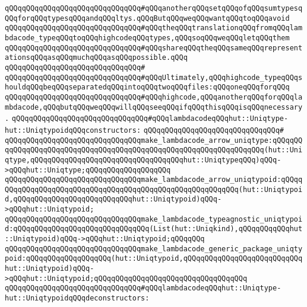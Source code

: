 \verb|qQQqqQQqqQQqqQQqqQQqqQQqqQQqqQQq#qQQqanotherqQQqsetqQQqofqQQqsumtypesqQQqforqQQqtypesqQQqandqQQqltys.qQQqButqQQqweqQQqwantqQQqtoqQQqavoid|\newline
\verb|qQQqqQQqqQQqqQQqqQQqqQQqqQQqqQQq#qQQqtheqQQqtranslationqQQqfromqQQqlambdacode_typeqQQqtoqQQqhighcodeqQQqtypes,qQQqsoqQQqweqQQqletqQQqthem|\newline
\verb|qQQqqQQqqQQqqQQqqQQqqQQqqQQqqQQq#qQQqshareqQQqtheqQQqsameqQQqrepresentationsqQQqasqQQqmuchqQQqasqQQqpossible.qQQq|\newline
\verb|qQQqqQQqqQQqqQQqqQQqqQQqqQQqqQQq#|\newline
\verb|qQQqqQQqqQQqqQQqqQQqqQQqqQQqqQQq#qQQqUltimately,qQQqhighcode_typeqQQqshouldqQQqbeqQQqseparatedqQQqintoqQQqtwoqQQqfiles:qQQqoneqQQqforqQQq|\newline
\verb|qQQqqQQqqQQqqQQqqQQqqQQqqQQqqQQq#qQQqhighcode,qQQqanotherqQQqforqQQqlambdacode,qQQqbutqQQqweqQQqwillqQQqseeqQQqifqQQqthisqQQqisqQQqnecessary.|\newline
\newline
\newline
\verb|qQQqqQQqqQQqqQQqqQQqqQQqqQQqqQQq#qQQqlambdacodeqQQqhut::Uniqtype-hut::UniqtypoidqQQqconstructors:|\newline
\verb|qQQqqQQqqQQqqQQqqQQqqQQqqQQqqQQq#|\newline
\verb|qQQqqQQqqQQqqQQqqQQqqQQqqQQqqQQqmake_lambdacode_arrow_uniqtype:qQQqqQQqqQQqqQQqqQQqqQQqqQQqqQQqqQQqqQQqqQQqqQQqqQQqqQQqqQQqqQQqqQQq(hut::Uniqtype,qQQqqQQqqQQqqQQqqQQqqQQqqQQqqQQqqQQqhut::UniqtypeqQQq)qQQq->qQQqhut::Uniqtype;qQQqqQQqqQQqqQQqqQQq|\newline
\verb|qQQqqQQqqQQqqQQqqQQqqQQqqQQqqQQqmake_lambdacode_arrow_uniqtypoid:qQQqqQQqqQQqqQQqqQQqqQQqqQQqqQQqqQQqqQQqqQQqqQQqqQQqqQQqqQQq(hut::Uniqtypoid,qQQqqQQqqQQqqQQqqQQqqQQqqQQqhut::Uniqtypoid)qQQq->qQQqhut::Uniqtypoid;|\newline
\verb|qQQqqQQqqQQqqQQqqQQqqQQqqQQqqQQqmake_lambdacode_typeagnostic_uniqtypoid:qQQqqQQqqQQqqQQqqQQqqQQqqQQqqQQq(List(hut::Uniqkind),qQQqqQQqqQQqhut::Uniqtypoid)qQQq->qQQqhut::Uniqtypoid;qQQqqQQq|\newline
\verb|qQQqqQQqqQQqqQQqqQQqqQQqqQQqqQQqmake_lambdacode_generic_package_uniqtypoid:qQQqqQQqqQQqqQQqqQQq(hut::Uniqtypoid,qQQqqQQqqQQqqQQqqQQqqQQqqQQqhut::Uniqtypoid)qQQq->qQQqhut::Uniqtypoid;qQQqqQQqqQQqqQQqqQQqqQQqqQQqqQQqqQQq|\newline
\newline
\verb|qQQqqQQqqQQqqQQqqQQqqQQqqQQqqQQq#qQQqlambdacodeqQQqhut::Uniqtype-hut::UniqtypoidqQQqdeconstructors:|\newline
